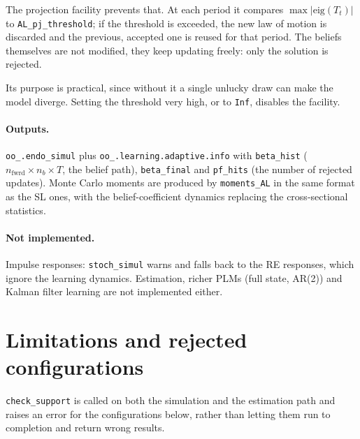 \documentclass[11pt,a4paper]{article}
\newcommand{\command}[1]{\texttt{#1}}
\newcommand{\field}[1]{\texttt{#1}}
\begin{document}
The projection facility prevents that. At each period it compares
$\max|\mathrm{eig}(T_t)|$ to \texttt{AL\_pj\_threshold}; if the threshold is
exceeded, the new law of motion is discarded and the previous, accepted one is
reused for that period. The beliefs themselves are not modified, they keep
updating freely: only the solution is rejected.

Its purpose is practical, since without it a single unlucky draw can make the
model diverge. Setting the threshold very high, or to \texttt{Inf}, disables the
facility.

\paragraph{Outputs.} \field{oo\_.endo\_simul} plus
\field{oo\_.learning.adaptive.info} with \field{beta\_hist}
($n_{\text{fwrd}} \times n_b \times T$, the belief path), \field{beta\_final}
and \field{pf\_hits} (the number of rejected updates). Monte Carlo moments are
produced by \texttt{moments\_AL} in the same format as the SL ones, with the
belief-coefficient dynamics replacing the cross-sectional statistics.

\paragraph{Not implemented.} Impulse responses: \command{stoch\_simul} warns and
falls back to the RE responses, which ignore the learning dynamics. Estimation,
richer PLMs (full state, AR(2)) and Kalman filter learning are not implemented
either.


\section{Limitations and rejected configurations}
\label{sec:limitations}

\texttt{check\_support} is called on both the simulation and the estimation
path and raises an error for the configurations below, rather than letting them
run to completion and return wrong results.
\end{document}
